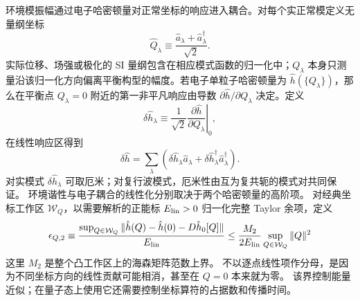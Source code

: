 环境模振幅通过电子哈密顿量对正常坐标的响应进入耦合。对每个实正常模定义无量纲坐标
\begin{equation}
{
\hat Q_\lambda
\equiv
\frac{\hat a_\lambda+\hat a_\lambda^\dagger}{\sqrt2}.}
\label{eq:dimensionless_normal_coordinate_definition}
\end{equation}
实际位移、场强或极化的 SI 量纲包含在相应模式函数的归一化中；$Q_\lambda$ 本身只测量沿该归一化方向偏离平衡构型的幅度。若电子单粒子哈密顿量为 $\hat h(\{Q_\lambda\})$，那么在平衡点 $Q_\lambda=0$ 附近的第一非平凡响应由导数 $\partial\hat h/\partial Q_\lambda$ 决定。定义
\begin{equation*}
\delta\hat h_\lambda
\equiv
\frac1{\sqrt2}
\left.\frac{\partial\hat h}{\partial Q_\lambda}\right|_0,
\end{equation*}
在线性响应区得到
\begin{equation}
{
\delta\hat h
=\sum_\lambda
\left(
\delta\hat h_\lambda\hat a_\lambda
+\delta\hat h_\lambda^\dagger\hat a_\lambda^\dagger
\right).}
\label{eq:general_linear_mode_hamiltonian_variation}
\end{equation}
对实模式 $\delta\hat h_\lambda$ 可取厄米；对复行波模式，厄米性由互为复共轭的模式对共同保证。
环境谐性与电子耦合的线性化分别取决于两个哈密顿量的高阶项。
对经典坐标工作区 $\mathcal W_Q$，以需要解析的正能标 $E_{\rm lin}>0$ 归一化完整 Taylor 余项，定义
\begin{equation*}
\epsilon_{Q,2}
\equiv
\frac{\sup_{Q\in\mathcal W_Q}\|\hat h(Q)-\hat h(0)-D\hat h_0[Q]\|}{E_{\rm lin}}
\le\frac{M_2}{2E_{\rm lin}}\sup_{Q\in\mathcal W_Q}\|Q\|^2
\end{equation*}
这里 $M_2$ 是整个凸工作区上的海森矩阵范数上界。
不以逐点线性项作分母，是因为不同坐标方向的线性贡献可能相消，甚至在 $Q=0$ 本来就为零。
该界控制能量近似；在量子态上使用它还需要控制坐标算符的占据数和传播时间。

